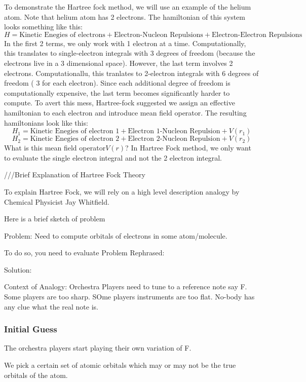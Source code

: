 \documentclass{article}
\begin{document}
To demonstrate the Hartree fock method, we will use an example of the helium
atom. Note that helium atom has 2 electrons.
The hamiltonian of this system looks something like this:
\[H = \text{Kinetic Enegies of electrons} + \text{Electron-Nucleon Repulsions} +
\text{Electron-Electron Repulsions}\]
In the first 2 terms, we only work with 1 electron at a time. Computationally,
this translates to single-electron integrals with 3 degrees of freedom (because
the electrons live in a 3 dimensional space). However, the last term involves
2 electrons. Computationallu, this tranlates to 2-electron integrals with
6 degrees of freedom ( 3 for each electron). Since each additional degree
of freedom is computationally expensive, the last term becomes significantly
harder to compute.
To avert this mess, Hartree-fock suggested we assign an effective hamiltonian
to each electron and introduce mean field operator. The resulting hamiltonians
look like this:
\[H_1 = \text{Kinetic Enegies of electron 1} + \text{Electron 1-Nucleon Repulsion} +
V(r_1)\]
\[H_2 = \text{Kinetic Enegies of electron 2} + \text{Electron 2-Nucleon Repulsion} +
V(r_2)\]
What is this mean field operator\(V(r)\)?
In Hartree Fock method, we only want to evaluate the single electron integral
and not the 2 electron integral.

///Brief Explanation of Hartree Fock Theory

To explain Hartree Fock, we will rely on a high level description analogy by Chemical
Physicist Jay Whitfield.

Here is a brief sketch of problem

Problem: Need to compute orbitals of electrons in some atom/molecule.

To do so, you need to evaluate
Problem Rephrased:

Solution:

Context of Analogy: Orchestra Players need to tune to a reference note say F.
Some players are too sharp. SOme players instruments are too flat. No-body
has any clue what the real note is.

\subsubsection{Initial Guess}
The orchestra players start playing their own variation of F.

We pick a certain set of atomic orbitals which may or may not be the true
orbitals of the atom.
\end{document}
